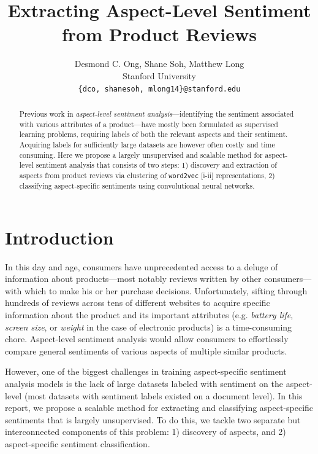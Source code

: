 \documentclass{article} %
\title{  Extracting Aspect-Level Sentiment from Product Reviews  }
\author{
Desmond C. Ong, Shane Soh, Matthew Long \\
Stanford University \\
\texttt{\{dco, shanesoh, mlong14\}@stanford.edu}
}
\begin{document}
\maketitle

\begin{abstract}
Previous work in \textit{aspect-level sentiment analysis}---identifying the sentiment associated with various attributes of a product---have mostly been formulated as supervised learning problems, requiring labels of both the relevant aspects and their sentiment. Acquiring labels for sufficiently large datasets are however often costly and time consuming. Here we propose a largely unsupervised and scalable method for aspect-level sentiment analysis that consists of two steps: 1) discovery and extraction of aspects from product reviews via clustering of \texttt{word2vec} [i-ii] representations, 2) classifying aspect-specific sentiments using convolutional neural networks.
\end{abstract}

\section{Introduction}

In this day and age, consumers have unprecedented access to a deluge of information about products---most notably reviews written by other consumers---with which to make his or her purchase decisions. Unfortunately, sifting through hundreds of reviews across tens of different websites to acquire specific information about the product and its important attributes (e.g. \textit{battery life}, \textit{screen size}, or \textit{weight} in the case of electronic products) is a time-consuming chore. Aspect-level sentiment analysis would allow consumers to effortlessly compare general sentiments of various aspects of multiple similar products.

However, one of the biggest challenges in training aspect-specific sentiment analysis models is the lack of large datasets labeled with sentiment on the aspect-level (most datasets with sentiment labels existed on a document level). In this report, we propose a scalable method for extracting and classifying aspect-specific sentiments that is largely unsupervised. To do this, we tackle two separate but interconnected components of this problem: 1) discovery of aspects, and 2) aspect-specific sentiment classification.
\end{document}
